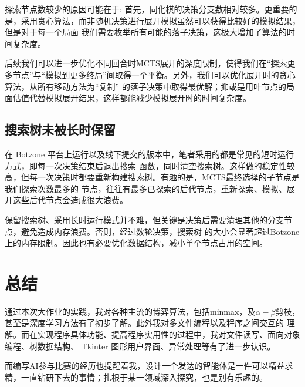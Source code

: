 \documentclass[12pt]{ctexart}
\begin{document}
	探索节点数较少的原因可能在于: 首先，同化棋的决策分支数相对较多。更重要的是，采用贪心算法，而非随机决策进行展开模拟虽然可以获得比较好的模拟结果，但是对于每一个局面
	我们需要枚举所有可能的落子决策，这极大增加了算法的时间复杂度。

	后续我们可以进一步优化不同回合时MCTS展开的深度限制，使得我们在“探索更多节点”与“模拟到更多终局”间取得一个平衡。另外，我们可以优化展开时的贪心算法，从所有移动方法为“复制”
	的落子决策中取得最优解；抑或是用叶节点的局面估值代替模拟展开结果，这样都能减少模拟展开时的时间复杂度。
		

	\subsection{搜索树未被长时保留}
	在 Botzone 平台上运行以及线下提交的版本中，笔者采用的都是常见的短时运行方式，即每一次决策结束后退出搜索
	函数，同时清空搜索树。这样做的稳定性较高，但每一次决策时都要重新构建搜索树。有趣的是，MCTS最终选择的子节点是我们探索次数最多的
	节点，往往有最多已探索的后代节点，重新探索、模拟、展开这些后代节点会造成很大浪费。

	保留搜索树、采用长时运行模式并不难，但关键是决策后需要清理其他的分支节点，避免造成内存浪费。否则，经过数轮决策，搜索树
	的大小会显著超过Botzone上的内存限制。因此也有必要优化数据结构，减小单个节点占用的空间。

	\section{总结}
	通过本次大作业的实践，我对各种主流的博弈算法，包括minmax，及$\alpha-\beta$剪枝，甚至是深度学习方法有了初步了解。此外我对多文件编程以及程序之间交互的
	理解。而在实现程序具体功能、提高程序实用性的过程中，我对文件读写、面向对象编程、树数据结构、
	Tkinter 图形用户界面、异常处理等有了进一步认识。

	而编写AI参与比赛的经历也提醒着我，设计一个发达的智能体是一件可以精益求精，一直钻研下去的事情；扎根于某一领域深入探究，也是别有乐趣的。

	
\end{document}
